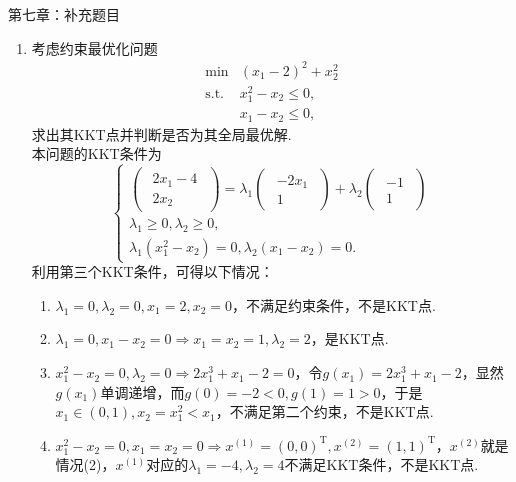 \clearpage
{\heiti 第七章：补充题目}
\begin{enumerate}
    \item 考虑约束最优化问题
    \[\begin{array}{lll}
        \min & (x_1-2)^2+x_2^2\\
        \mathrm{s.t.} & x_1^2-x_2 \leqslant 0,\\
        & x_1-x_2 \leqslant 0,
    \end{array}\]
    求出其KKT点并判断是否为其全局最优解.\\
    \sol 本问题的KKT条件为
    \[\begin{cases}
        \left(\begin{array}{cc}
            \begin{matrix}
                2x_1-4 \\ 2x_2
            \end{matrix}
        \end{array}\right)=\lambda_1\left(\begin{array}{cc}
            \begin{matrix}
                -2x_1 \\ 1
            \end{matrix}
        \end{array}\right)+\lambda_2\left(\begin{array}{cc}
            \begin{matrix}
                -1 \\ 1
            \end{matrix}
        \end{array}\right)\\
        \lambda_1 \geqslant 0, \lambda_2 \geqslant 0,\\
        \lambda_1(x_1^2-x_2)=0,\lambda_2(x_1-x_2)=0.
    \end{cases}\]
    利用第三个KKT条件，可得以下情况：
    \begin{enumerate}[label=(\arabic*)]
        \item $\lambda_1=0,\lambda_2=0,x_1=2,x_2=0$，不满足约束条件，不是KKT点.
        \item $\lambda_1=0,x_1-x_2=0 \Rightarrow x_1=x_2=1,\lambda_2=2$，是KKT点.
        \item $x_1^2-x_2=0,\lambda_2=0 \Rightarrow 2x_1^3+x_1-2=0$，令$g(x_1)=2x_1^3+x_1-2$，显然$g(x_1)$单调递增，而$g(0)=-2<0,g(1)=1>0$，于是$x_1 \in (0,1),x_2=x_1^2 < x_1$，不满足第二个约束，不是KKT点.
        \item $x_1^2-x_2=0,x_1=x_2=0 \Rightarrow x^{(1)}=(0,0)^\mathrm{T},x^{(2)}=(1,1)^\mathrm{T}$，$x^{(2)}$就是情况(2)，$x^{(1)}$对应的$\lambda_1=-4,\lambda_2=4$不满足KKT条件，不是KKT点.

\end{enumerate}
\end{enumerate}
